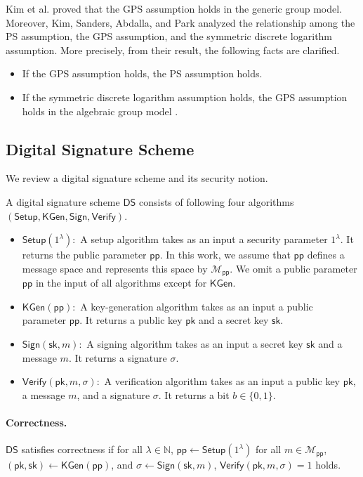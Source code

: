 \documentclass[a4paper,11pt]{fullverllncs}
\newcommand{\N}{\mathbb{N}}
\newcommand{\DS}{\mathsf{DS}}
\newcommand{\sk}{\mathsf{sk}}
\newcommand{\pk}{\mathsf{pk}}
\newcommand{\pp}{\mathsf{pp}}
\newcommand{\Setup}{\mathsf{Setup}}
\newcommand{\KGen}{\mathsf{KGen}}
\newcommand{\Sign}{\mathsf{Sign}}
\newcommand{\Verify}{\mathsf{Verify}}
\begin{document}
Kim et al. \cite{KLAP21} proved that the GPS assumption holds in the generic group model.
Moreover, Kim, Sanders, Abdalla, and Park \cite{KSAP21} analyzed the relationship among the PS assumption, the GPS assumption, and the symmetric discrete logarithm assumption.
More precisely, from their result, the following facts are clarified.

\begin{itemize}
\item If the GPS assumption holds, the PS assumption holds.
\item If the symmetric discrete logarithm assumption holds, the GPS assumption holds in the algebraic group model \cite{FKL18}.
\end{itemize}



\subsection{Digital Signature Scheme}
We review a digital signature scheme and its security notion.
\begin{definition}
A digital signature scheme $\DS$ consists of following four algorithms $(\Setup, \KGen, \allowbreak \Sign, \Verify)$.
\begin{itemize}
\item $\Setup (1^{\lambda}):$ A setup algorithm takes as an input a security parameter $1^{\lambda}$. It returns the public parameter $\pp$.
In this work, we assume that $\pp$ defines a message space and represents this space by  $\mathcal{M}_{\pp}$.
We omit a public parameter $\pp$ in the input of all algorithms except for $\KGen$.

\item $\KGen (\pp):$ A key-generation algorithm takes as an input a public parameter $\pp$. It returns a public key $\pk$ and a secret key $\sk$.

\item $\Sign (\sk, m):$ A signing algorithm takes as an input a secret key $\sk$ and a message $m$. It returns a signature $\sigma$.

\item $\Verify (\pk, m, \sigma):$ A verification algorithm takes as an input a public key $\pk$, a message $m$, and a signature $\sigma$.
It returns a bit $b \in  \{0, 1\}$.
\end{itemize}
\paragraph{\bf Correctness.}
$\DS$ satisfies correctness if for all $\lambda \in \N$, $\pp \leftarrow \Setup (1^{\lambda})$ for all $m \in \mathcal{M}_{\pp}$, $(\pk, \sk) \leftarrow \KGen(\pp)$, and $\sigma \leftarrow \Sign(\sk, m)$, $\Verify(\pk, m, \sigma) = 1$ holds.
\end{definition}
\end{document}
